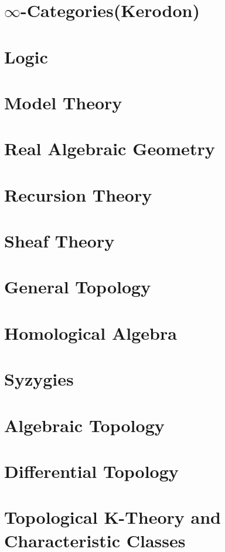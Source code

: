 \documentclass{ModulEN}
\begin{document}
	\part{$\infty$-Categories(Kerodon)}
	
	\part{Logic}
	
	\part{Model Theory}
	
	\part{Real Algebraic Geometry}
	
	\part{Recursion Theory}
	
	\part{Sheaf Theory}
	
	\part{General Topology}
	
	\part{Homological Algebra}
		
		
	\part{Syzygies}
	
		
	
	\part{Algebraic Topology}
	
	
	\part{Differential Topology}
	
	\part{Topological K-Theory and Characteristic Classes}
		
	
\end{document}
